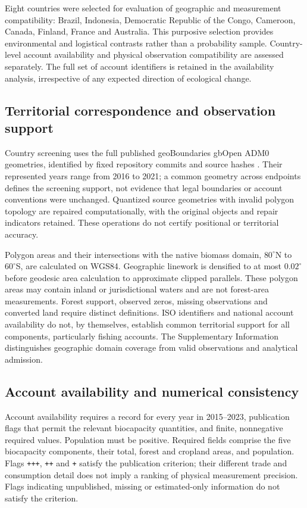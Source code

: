 \documentclass[11pt,a4paper]{article}
\begin{document}
Eight countries were selected for evaluation of geographic and measurement compatibility: Brazil, Indonesia, Democratic Republic of the Congo, Cameroon, Canada, Finland, France and Australia. This purposive selection provides environmental and logistical contrasts rather than a probability sample. Country-level account availability and physical observation compatibility are assessed separately. The full set of account identifiers is retained in the availability analysis, irrespective of any expected direction of ecological change.

\subsection{Territorial correspondence and observation support}
Country screening uses the full published geoBoundaries gbOpen ADM0 geometries, identified by fixed repository commits and source hashes \citep{Runfola2020}. Their represented years range from 2016 to 2021; a common geometry across endpoints defines the screening support, not evidence that legal boundaries or account conventions were unchanged. Quantized source geometries with invalid polygon topology are repaired computationally, with the original objects and repair indicators retained. These operations do not certify positional or territorial accuracy.

Polygon areas and their intersections with the native biomass domain, $80^\circ$N to $60^\circ$S, are calculated on WGS84. Geographic linework is densified to at most $0.02^\circ$ before geodesic area calculation to approximate clipped parallels. These polygon areas may contain inland or jurisdictional waters and are not forest-area measurements. Forest support, observed zeros, missing observations and converted land require distinct definitions. ISO identifiers and national account availability do not, by themselves, establish common territorial support for all components, particularly fishing accounts. The Supplementary Information distinguishes geographic domain coverage from valid observations and analytical admission.

\subsection{Account availability and numerical consistency}
Account availability requires a record for every year in 2015--2023, publication flags that permit the relevant biocapacity quantities, and finite, nonnegative required values. Population must be positive. Required fields comprise the five biocapacity components, their total, forest and cropland areas, and population. Flags \texttt{+++}, \texttt{++} and \texttt{+} satisfy the publication criterion; their different trade and consumption detail does not imply a ranking of physical measurement precision. Flags indicating unpublished, missing or estimated-only information do not satisfy the criterion.
\end{document}
